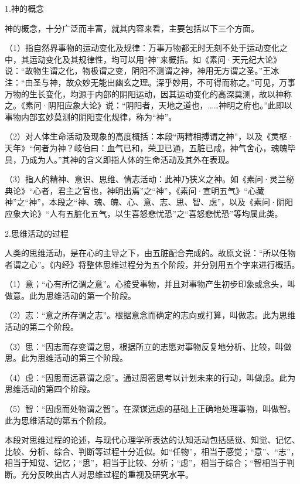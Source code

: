 \documentclass[12pt]{ctexbook}
\begin{document}

1.神的概念

神的概念，十分广泛而丰富，就其内容来看，主要包括以下三个方面。

（1）指自然界事物的运动变化及规律：万事万物都无时无刻不处于运动变化之中，其运动变化及其规律性，均可以用“神”来概括。如《素问·天元纪大论》说：“故物生谓之化，物极谓之变，阴阳不测谓之神，神用无方谓之圣。”王冰注：“由圣与神，故众妙无能出幽玄之理。深乎妙用，不可得而称之。”可见，万事万物的生长变化，均源于内部的阴阳运动，因其运动变化的高深莫测，故以神称之。《素问·阴阳应象大论》说：“阴阳者，天地之道也，……神明之府也。”此即以事物内部玄妙莫测的阴阳变化规律，称为“神”。

（2）对人体生命活动及现象的高度概括：本段“两精相搏谓之神”，以及《灵枢·天年》“何者为神？岐伯曰：血气已和，荣卫已通，五脏已成，神气舍心，魂魄毕具，乃成为人。”其神的含义即指人体的生命活动及其外在表现。

（3）指人的精神、意识、思维、情志活动：此神乃狭义之神。如《素问·灵兰秘典论》“心者，君主之官也，神明出焉”之“神”，《素问·宣明五气》“心藏神”之“神”，本段之“神、魂、魄、心、意、志、思、智、虑”，以及《素问·阴阳应象大论》“人有五脏化五气，以生喜怒悲忧恐”之“喜怒悲忧恐”等均属此类。

2.思维活动的过程

人类的思维活动，是在心的主导之下，由五脏配合完成的。故原文说：“所以任物者谓之心”。《内经》将整体思维过程分为五个阶段，并分别用五个字来进行概括。

（1）意；“心有所忆谓之意”。心接受事物，并且对事物产生初步印象或念头，叫做意。此为思维活动的第一个阶段。

（2）志：“意之所存谓之志”。根据意念而确定的志向或打算，叫做志。此为思维活动的第二个阶段。

（3）思：“因志而存变谓之思，根据所立的志愿对事物反复地分析、比较，叫做思。此为思维活动的第三个阶段。

（4）虑：“因思而远慕谓之虑”。通过周密思考以计划未来的行动，叫做虑。此为思维活动的第四个阶段。

（5）智：“因虑而处物谓之智”。在深谋远虑的基础上正确地处理事物，叫做智。此为思维活动的第五个阶段。

本段对思维过程的论述，与现代心理学所表达的认知活动包括感觉、知觉、记忆、比较、分析、综合、判断等过程十分近似。如“任物”，相当于感觉；“意”、“志”，相当于知觉、记忆；“思”，相当于比较、分析；“虑”，相当于综合；“智相当于判断。充分反映出古人对思维过程的重视及研究水平。


\end{document}
